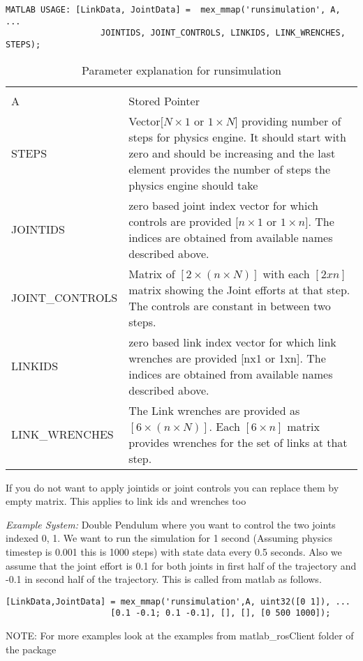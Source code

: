 \documentclass[letterpaper,10pt]{article}
\begin{document}
\begin{itemize}
\begin{Verbatim}[frame=single]
    MATLAB USAGE: [LinkData, JointData] =  mex_mmap('runsimulation', A,  ...
                   JOINTIDS, JOINT_CONTROLS, LINKIDS, LINK_WRENCHES, STEPS);
\end{Verbatim}
    \begin{table}[h!]
    \begin{tabular}{|p{}|p{}|}
      \hline\\
      A & Stored Pointer \\ \hline
      STEPS& Vector$[N\times 1$ or $1\times N]$  providing number of steps for physics engine. It should start with zero and should be increasing and the last element provides the number of steps the physics engine should take\\ \hline
      JOINTIDS & zero based joint index vector for which controls are provided $[n\times 1$ or $1\times n]$. The indices are obtained from available names described above.\\ \hline
      JOINT\_CONTROLS & Matrix of $[2\times (n\times N)]$ with each $[2xn]$ matrix showing the Joint efforts at that step. The controls are constant in between two steps.\\ \hline %
      LINKIDS &  zero based link index vector for which link wrenches are provided [nx1 or 1xn]. The indices are obtained from available names described above.\\ \hline
      LINK\_WRENCHES & The Link wrenches are provided as $[6 \times (n \times N)]$. Each $[6\times n]$ matrix provides wrenches for the set of links at that step.\\
      \hline
    \end{tabular}
    \caption{Parameter explanation for runsimulation}
    \end{table}
    If you do not want to apply jointids or joint controls you can replace them by empty matrix. This applies to link ids and wrenches too
    
    \textit{Example System:} Double Pendulum where you want to control the two joints indexed 0, 1. We want to run the simulation for 1 second   
    (Assuming physics timestep is 0.001 this is 1000 steps) with state data every 0.5 seconds. Also we assume that the joint effort is 0.1 for both joints in first half of the trajectory
    and -0.1 in second half of the trajectory. This is called from matlab as follows.
    \begin{Verbatim}[frame=single]
    [LinkData,JointData] = mex_mmap('runsimulation',A, uint32([0 1]), ...
			         [0.1 -0.1; 0.1 -0.1], [], [], [0 500 1000]);
    \end{Verbatim}
  NOTE: For more examples look at the examples from matlab\_rosClient folder of the package
\end{itemize}
\end{document}
